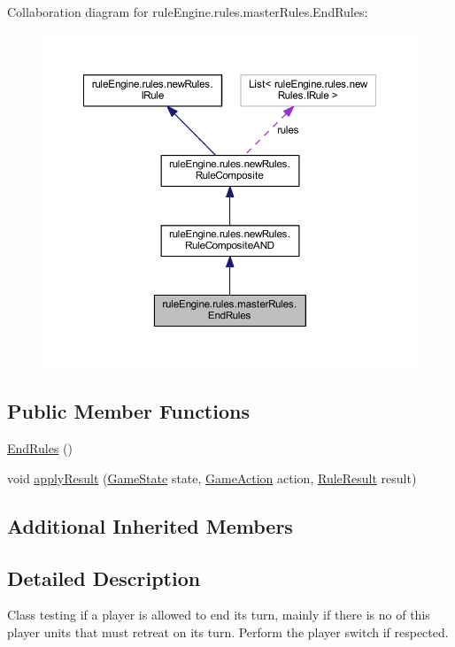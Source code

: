 Collaboration diagram for rule\+Engine.\+rules.\+master\+Rules.\+End\+Rules\+:
\nopagebreak
\begin{figure}[H]
\begin{center}
\leavevmode
\includegraphics[width=350pt]{classrule_engine_1_1rules_1_1master_rules_1_1_end_rules__coll__graph}
\end{center}
\end{figure}
\subsection*{Public Member Functions}
\begin{DoxyCompactItemize}
\item 
\mbox{\hyperlink{classrule_engine_1_1rules_1_1master_rules_1_1_end_rules_af3e71cbc217651b5d7f7eda2ceee5bcc}{End\+Rules}} ()
\item 
void \mbox{\hyperlink{classrule_engine_1_1rules_1_1master_rules_1_1_end_rules_a41820fbefc132761e0190e435ee48bc6}{apply\+Result}} (\mbox{\hyperlink{classgame_1_1game_state_1_1_game_state}{Game\+State}} state, \mbox{\hyperlink{classrule_engine_1_1_game_action}{Game\+Action}} action, \mbox{\hyperlink{classrule_engine_1_1_rule_result}{Rule\+Result}} result)
\end{DoxyCompactItemize}
\subsection*{Additional Inherited Members}


\subsection{Detailed Description}
Class testing if a player is allowed to end its turn, mainly if there is no of this player units that must retreat on its turn. Perform the player switch if respected. 

